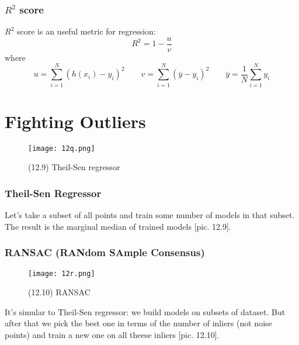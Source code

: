 \subsubsection*{$R^2$ score}

$R^2$ score is an useful metric for regression:
$$R^2=1-\frac{u}{v}$$
where
$$u=\sum\limits_{i=1}^{N}(h(x_i)-y_i)^2\qquad v=\sum\limits_{i=1}^{N}(\overline{y}-y_i)^2\qquad \overline{y}=\frac{1}{N}\sum\limits_{i=1}^{N}y_i$$

\section{Fighting Outliers}
\vspace{-0.6cm}

\begin{wrapfigure}{r}{0.3\linewidth}
	\vspace{-2.7cm}
  \begin{center}
    \texttt{[image: 12q.png]}
  \end{center}
  \vspace{-0.6cm}
  \caption*{(12.9) Theil-Sen regressor}
\end{wrapfigure}

\subsubsection*{Theil-Sen Regressor}

Let's take a subset of all points and train some number of models in that subset. The result is the marginal median of trained models [pic. 12.9].

\newpage
\subsubsection*{RANSAC (RANdom SAmple Consensus)}

\begin{wrapfigure}{r}{0.3\linewidth}
	\vspace{-2cm}
  \begin{center}
    \texttt{[image: 12r.png]}
  \end{center}
  \vspace{-0.6cm}
  \caption*{(12.10) RANSAC}
  \vspace{-1cm}
\end{wrapfigure}
It's simular to Theil-Sen regressor: we build models on subsets of dataset. But after that we pick the best one in terms of the number of inliers (not noise points) and train a new one on all theese inliers [pic. 12.10].

